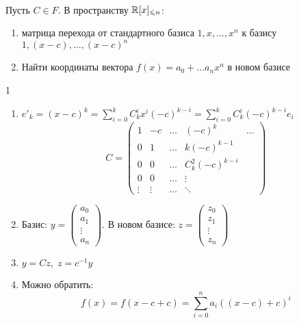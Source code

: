 \begin{problem}~
    
    Пусть $C \in F$. В пространству $\mathbb{R}[x]_{\leqslant n}$:
    
    \begin{enumerate}
        \item матрица перехода от стандартного базиса $1, x, \dots, x^n$ к базису $1, (x - c), \dots, (x - c)^n$
        \item Найти координаты вектора $f(x) = a_0 + \dots a_n x^n$ в новом базисе
    \end{enumerate}

    \begin{solution} 1

        \begin{enumerate}
            \item $e'_k = (x - c)^k = \sum_{i = 0}^{k}C_k^i x^i (-c)^{k - i} = \sum_{i = 0}^{k}C_k^i (-c)^{k - i}e_i $
            $$C = \begin{pmatrix}
                1 & -c & \dots & (-c)^k & \dots \\
                0 & 1 & \dots & k (-c)^{k - 1} \\
                0 & 0 & \dots & C_k^2 (-c)^{k - i} \\
                0 & 0 & \dots & \vdots \\
                \vdots & \vdots & \dots & \ddots
            \end{pmatrix}$$
            \item Базис: $y = \begin{pmatrix}
                a_0 \\ a_1 \\ \vdots \\ a_n
            \end{pmatrix}$. В новом базисе: $z = \begin{pmatrix}
                z_0 \\ z_1 \\ \vdots \\ z_n
            \end{pmatrix}$
            \item $y = Cz, \; z = c^{-1} y$
            \item Можно обратить:
            $$f(x) = f(x - c + c) = \sum_{i = 0}^{n}a_i ((x - c) + c)^i$$
        \end{enumerate}
        
    \end{solution}

\end{problem}